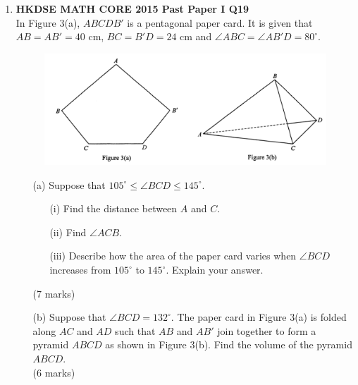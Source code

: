 \documentclass[12pt]{article}
\begin{document}
\begin{enumerate}
	\item \textbf{HKDSE MATH CORE 2015 Past Paper I Q19}\\
	In Figure 3(a), $ABCDB'$ is a pentagonal paper card. It is given that $AB = AB' = 40$ cm, $BC = B'D = 24$ cm and $\angle ABC = \angle AB'D = 80^\circ$.
	\begin{figure}[H]
		\centering
		\includegraphics[width = .3\linewidth]{2015Figure1.3}
	\end{figure}
	\begin{enumerate}
		\item[(a)] Suppose that $105^\circ \leq \angle BCD \leq 145^\circ$.
		\begin{enumerate}
			\item[(i)] Find the distance between $A$ and $C$.
			\item[(ii)] Find $\angle ACB$.
			\item[(iii)] Describe how the area of the paper card varies when $\angle BCD$ increases from $105^\circ$ to $145^\circ$. Explain your answer.
		\end{enumerate}
		(7 marks)
		\item[(b)] Suppose that $\angle BCD = 132^\circ$. The paper card in Figure 3(a) is folded along $AC$ and $AD$ such that $AB$ and $AB'$ join together to form a pyramid $ABCD$ as shown in Figure 3(b). Find the volume of the pyramid $ABCD$. \\(6 marks)
	\end{enumerate}
\end{enumerate}
\end{document}
